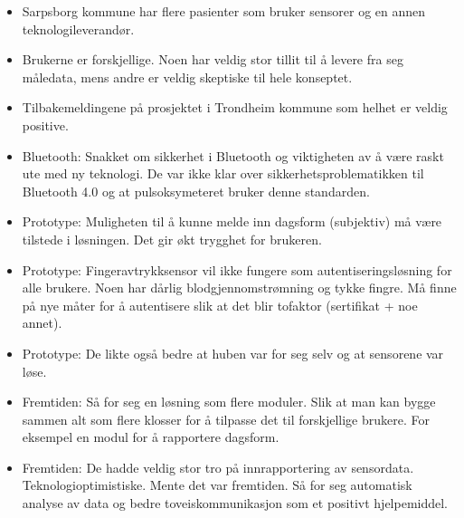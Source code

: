 \begin{itemize}
  \begin{itemize}
  \tightlist
  \item
    Sarpsborg kommune har flere pasienter som bruker sensorer og en
    annen teknologileverandør.
  \item
    Brukerne er forskjellige. Noen har veldig stor tillit til å levere
    fra seg måledata, mens andre er veldig skeptiske til hele konseptet.
  \item
    Tilbakemeldingene på prosjektet i Trondheim kommune som helhet er
    veldig positive.
  \item
    Bluetooth: Snakket om sikkerhet i Bluetooth og viktigheten av å være
    raskt ute med ny teknologi. De var ikke klar over
    sikkerhetsproblematikken til Bluetooth 4.0 og at pulsoksymeteret
    bruker denne standarden.
  \item
    Prototype: Muligheten til å kunne melde inn dagsform (subjektiv) må
    være tilstede i løsningen. Det gir økt trygghet for brukeren.
  \item
    Prototype: Fingeravtrykksensor vil ikke fungere som
    autentiseringsløsning for alle brukere. Noen har dårlig
    blodgjennomstrømning og tykke fingre. Må finne på nye måter for å
    autentisere slik at det blir tofaktor (sertifikat + noe annet).
  \item
    Prototype: De likte også bedre at huben var for seg selv og at
    sensorene var løse.
  \item
    Fremtiden: Så for seg en løsning som flere moduler. Slik at man kan bygge
    sammen alt som flere klosser for å tilpasse det til forskjellige
    brukere. For eksempel en modul for å rapportere dagsform.
  \item
    Fremtiden: De hadde veldig stor tro på innrapportering av sensordata.
    Teknologioptimistiske. Mente det var fremtiden. Så for seg
    automatisk analyse av data og bedre toveiskommunikasjon som et
    positivt hjelpemiddel.
  \end{itemize}
\end{itemize}
